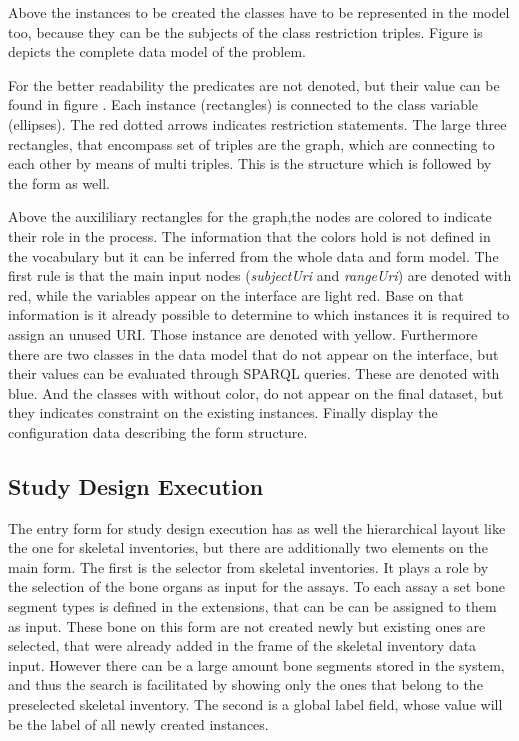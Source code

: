 


Above the instances to be created the classes have to be represented in the model too, because they can be the subjects of the class restriction triples.
 Figure  is depicts the complete data model of the problem.


For the better readability the predicates are not denoted, but their value can be found in figure . Each instance (rectangles) is connected to the class variable (ellipses). The red dotted arrows indicates restriction statements. The large three rectangles, that encompass set of triples are the graph, which are connecting to each other by means of multi triples. This is the structure which is followed by the form as well.




Above the auxililiary rectangles for the graph,the nodes are colored to indicate their role in the process. The information that the colors hold is not defined in the vocabulary but it can be inferred from the whole data and form model. The first rule is that the main input nodes (\textit{subjectUri} and \textit{rangeUri}) are denoted with red, while the variables appear on the interface are light red. Base on that information is it already possible to determine to which instances it is required to assign an unused URI. Those instance are denoted with yellow.
Furthermore there are two classes in the data model that do not appear on the interface, but their values can be evaluated through SPARQL queries. These are denoted with blue. And the classes with without color, do not appear on the final dataset, but they indicates constraint on the existing instances.
Finally  display the configuration data describing the form structure. 


\subsection{Study Design Execution}


The entry form for study design execution has as well the hierarchical layout like the one for skeletal inventories, but there are additionally two elements on the main form. The first is the selector from skeletal inventories. It plays a role by the selection of the bone organs as input for the assays. To each assay a set bone segment types is defined in the extensions, that can be can be assigned to them as input. These bone on this form are not created newly but existing ones are selected, that were already added in the frame of the skeletal inventory data input.  However there can be a large amount bone segments stored in the system, and thus the search is facilitated by showing only the ones that belong to the preselected skeletal inventory. The second is a global label field, whose value will be the label of all newly created instances.




